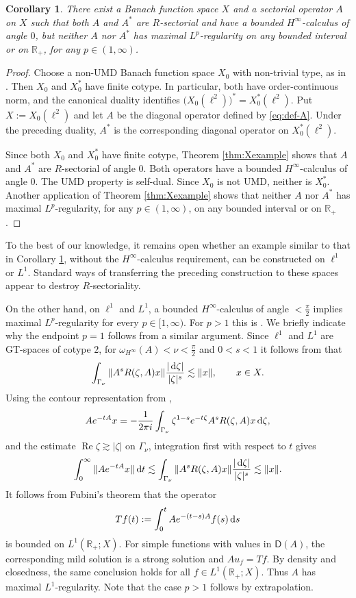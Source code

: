 \documentclass{amsart}
\theoremstyle{plain}
\theoremstyle{remark}
\theoremstyle{plain}
\newtheorem{corollary}[theorem]{Corollary}
\numberwithin{equation}{section}
\newcommand{\R}{\mathbb R}
\newcommand{\1}{\mathbf 1}
\newcommand{\dd}{\,{\rm d}}
\newcommand{\Dom}{\mathsf{D}}
\begin{document}
\begin{corollary}\label{cor:dual-stable-counterexample}
There exist a Banach function space $X$ and a sectorial operator $A$ on $X$ such that both $A$ and $A^*$ are $R$-sectorial and have a bounded $H^\infty$-calculus of angle $0$, but neither $A$ nor $A^*$ has maximal $L^p$-regularity on any bounded interval or on $\R_+$, for any $p\in(1,\infty)$.
\end{corollary}
\begin{proof} 
Choose a non-UMD Banach function space $X_0$ with non-trivial type, as in \cite[Section 4.3.c]{HNVW1}. Then $X_0$ and $X_0^*$ have finite cotype. In particular, both have order-continuous norm, and the canonical duality identifies $\bigl(X_0(\ell^2)\bigr)^* =  X_0^*(\ell^2).$ Put $X:=X_0(\ell^2)$ and let $A$ be the diagonal operator defined by \eqref{eq:def-A}. Under the preceding duality, $A^*$ is the corresponding diagonal operator on $X_0^*(\ell^2)$.

Since both $X_0$ and $X_0^*$ have finite cotype, Theorem \ref{thm:Xexample} shows that $A$ and $A^*$ are $R$-sectorial of angle $0$. Both operators have a bounded $H^\infty$-calculus of angle $0$. The UMD property is self-dual. Since $X_0$ is not UMD, neither is $X_0^*$. Another application of Theorem \ref{thm:Xexample} shows that neither $A$ nor $A^*$ has maximal $L^p$-regularity, for any $p\in(1,\infty)$, on any bounded interval or on $\R_+$.
\end{proof}

To the best of our knowledge, it remains open whether an example similar to that in Corollary \ref{cor:dual-stable-counterexample}, without the $H^\infty$-calculus requirement, can be constructed on $\ell^1$ or $L^1$. Standard ways of transferring the preceding construction to these spaces appear to destroy $R$-sectoriality. 

On the other hand, on $\ell^1$ and $L^1$, a bounded $H^\infty$-calculus of angle $<\frac{\pi}{2}$ implies maximal $L^p$-regularity for every $p\in[1,\infty)$. For $p>1$ this is \cite[Theorem 7.5]{KWcalc}. We briefly indicate why the endpoint $p=1$ follows from a similar argument. Since $\ell^1$ and $L^1$ are GT-spaces of cotype $2$, for
$\omega_{H^\infty}(A)<\nu<\frac{\pi}{2}$ and $0<s<1$ it follows from \cite[Proposition 7.1]{KWcalc} that
\[
\int_{\Gamma_\nu} \|A^sR(\zeta,A)x\|\frac{|\dd\zeta|}{|\zeta|^s}\lesssim \|x\|, \qquad x\in X.
\]
Using the contour representation from \cite[Proposition 4.2]{KWcalc},
\[
        Ae^{-tA}x =-\frac{1}{2\pi i} \int_{\Gamma_\nu} \zeta^{1-s}e^{-t\zeta}A^sR(\zeta,A)x\dd\zeta,
\]
and the estimate $\operatorname{Re}\zeta\gtrsim|\zeta|$ on $\Gamma_\nu$, integration first with respect to $t$ gives
\[
        \int_0^\infty\|Ae^{-tA}x\|\dd t \lesssim \int_{\Gamma_\nu} \|A^sR(\zeta,A)x\|\frac{|\dd\zeta|}{|\zeta|^s} \lesssim \|x\|.
\]
It follows from Fubini's theorem that the operator
\[
        Tf(t) := \int_0^t Ae^{-(t-s)A}f(s)\dd s
\]
is bounded on $L^1(\R_+;X)$. For simple functions with values in $\Dom(A)$, the corresponding mild solution is a strong solution and $Au_f=Tf$. By density and closedness, the same conclusion holds for all $f\in L^1(\R_+;X)$. Thus $A$ has maximal $L^1$-regularity. Note that the case $p>1$ follows by extrapolation. 
\end{document}
